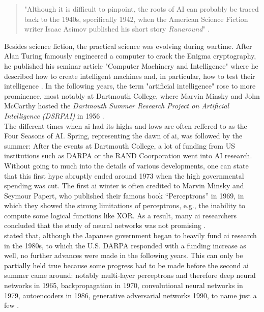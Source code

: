 \documentclass[
  a4paper,  %
  twoside,  %
  bibliography=totoc,
  headsepline,
  cleardoublepage=empty,
  parskip=half,
  draft=false
]{scrbook}
\begin{document}
\begin{quotation}
"Although it is difficult to pinpoint, the roots of AI can probably be traced back to the 1940s, specifically 1942, when the American Science Fiction writer Isaac Asimov published his short story \textit{Runaround}" \cite*{haenleinBriefHistoryArtificial2019}. 
\end{quotation}

Besides science fiction, the practical science was evolving during wartime. After Alan Turing famously engineered a computer to crack the Enigma cryptography, he published his seminar article "Computer Machinery and Intelligence" where he described how to create intelligent machines and, in particular, how to test their intelligence \cite{haenleinBriefHistoryArtificial2019}. 
In the following years, the term "artificial intelligence" rose to more prominence, most notably at Dartmouth College, where Marvin Minsky and John McCarthy hosted the \textit{Dartmouth Summer Research Project on Artificial Intelligence (DSRPAI)} in 1956 \cite{flasinskiHistoryArtificialIntelligence2016}. \\
The different times when \gls{ai} had its highs and lows are often reffered to as the Four Seasons of AI. Spring, representing the dawn of \gls{ai}, was followed by the summer: After the events at Dartmouth College, a lot of funding from US institutions such as DARPA or the RAND Coorporation went into AI research. Without going to much into the details of various developments, one can state that this first hype abruptly ended around 1973 when the high governmental spending was cut. The first \gls{ai} winter is often credited to Marvin Minsky and Seymour Papert, who published their famous book “Perceptrons” \cite{minskyPerceptronsIntroductionComputational2017} in 1969, in which they showed the strong limitations of perceptrons, e.g., the inability to compute some logical functions like XOR. As a result, many \gls{ai} researchers concluded that the study of neural networks was not promising \cite{flasinskiHistoryArtificialIntelligence2016}. \\
 stated that, although the Japanese government began to heavily fund \gls{ai} research in the 1980s, to which the U.S. DARPA responded with a funding increase as well, no further advances were made in the following years. This can only be partially held true because some progress had to be made before the second \gls{ai} summer came around: notably multi-layer perceptrons and therefore deep neural networks in 1965, backpropagation in 1970, convolutional neural networks in 1979, autoencoders in 1986, generative adversarial networks 1990, to name just a few \cite{schmidhuberAnnotatedHistoryModern2022}. \\
\end{document}
